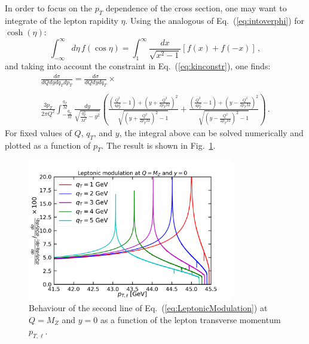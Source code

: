 \documentclass[10pt,a4paper]{article}
\begin{document}
In order to focus on the $p_T$ dependence of the cross section, one
may want to integrate of the lepton rapidity $\eta$. Using the
analogous of Eq.~(\ref{eq:intoverphi}) for $\cosh(\eta)$:
\begin{equation}\label{eq:intovereta}
\int_{-\infty}^{\infty}d\eta\, f(\cos\eta) = \int_{1}^{\infty}\frac{dx}{\sqrt{x^2-1}}\left[f(x)+f(-x)\right]\,,
\end{equation}
and taking into account the constraint in Eq.~(\ref{eq:kinconstr}),
one finds:
\begin{equation}\label{eq:LeptonicModulation}
\begin{array}{l}
\displaystyle \frac{d\sigma}{dQ dy dq_T dp_T} =\frac{d\sigma}{dQ dy
  dq_T} \times\\
\\
\displaystyle\frac
                                                          {3p_T}{2\pi
                                                          Q^2}\int_{-\frac{q_T}{M}}^{\frac{q_T}{M}}
  \frac{dy}{\sqrt{\frac{q_T^2}{M^2}-y^2}}\left(\frac{\left(\frac{Q^2}{4
  p_T^2}-1\right)+\left(y+\frac{Q^2}{2p_TM}\right)^2}{\sqrt{\left(y+\frac{Q^2}{2p_TM}\right)^2-1}}+\frac{\left(\frac{Q^2}{4
  p_T^2}-1\right)+\left(y-\frac{Q^2}{2p_TM}\right)^2}{\sqrt{\left(y-\frac{Q^2}{2p_TM}\right)^2-1}}\right)\,.
\end{array}
\end{equation}
For fixed values of $Q$, $q_T$, and $y$, the integral above can be
solved numerically and plotted as a function of $p_T$. The result is
shown in Fig.~\ref{fig:LeptonicModulation}.
\begin{figure}[t]
  \begin{centering}
    \includegraphics[width=0.8\textwidth]{plots/LeptonicModulation}
    \caption{Behaviour of the second line of
      Eq.~(\ref{eq:LeptonicModulation}) at $Q=M_Z$ and $y=0$ as a
      function of the lepton transverse momentum
      $p_{T,\ell}$.\label{fig:LeptonicModulation}}
  \end{centering}
\end{figure}
\end{document}
